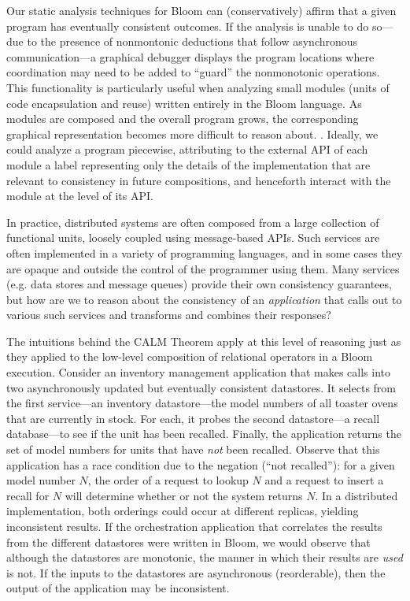 Our static analysis techniques for Bloom can
(conservatively) affirm that a given program has eventually consistent outcomes.
If the analysis is unable to do so---due to the presence of nonmontonic deductions
that follow asynchronous communication---a graphical debugger displays the
program locations where coordination may need to be added to ``guard'' the
nonmonotonic operations.    This functionality is particularly useful when
analyzing small modules (units of code encapsulation and reuse) written 
entirely in the Bloom language.
As modules are composed and the overall program grows, the corresponding graphical representation becomes more difficult to reason about.  .  Ideally,
we could analyze a program piecewise, attributing to the external API of each module a
label representing only the details of the implementation that are relevant to
consistency in future compositions, and henceforth interact with the module at
the level of its API.  


In practice, distributed systems are often composed from a large 
collection of functional units, loosely coupled using message-based APIs.
Such services are often implemented in a variety of programming 
languages, and in some cases they are opaque and outside the control of
the programmer using them.  
Many services (e.g. data stores and message queues) provide their own 
consistency guarantees, but how are we to reason about the consistency of an
\emph{application} that calls out to various such services and transforms
and combines their responses?  

The intuitions behind the CALM Theorem apply at this level of reasoning
just as they applied to the low-level composition of relational operators
in a Bloom execution.  Consider an inventory management application 
that makes calls into two asynchronously updated but
eventually consistent datastores.  It selects from the first service---an 
inventory datastore---the model numbers of all toaster ovens that are currently in stock.  For each, it probes the second datastore---a recall database---to
see if the unit has been recalled.  Finally, the application returns the 
set of model numbers for units that have \emph{not} been recalled.  Observe that this
application has a race condition due to the negation (``not recalled''): for a given model number $N$, the order of a request to lookup $N$ and a request to insert a recall for $N$ will determine whether or not the system returns $N$.  In a distributed implementation, both orderings could occur at different replicas, yielding inconsistent results.  If the orchestration
application that correlates the results from the different datastores were written in Bloom, we would observe that although the datastores are monotonic, 
the manner in which their results are \emph{used} is not.  If the inputs to 
the datastores are asynchronous (reorderable), then the output of the 
application may be inconsistent.


